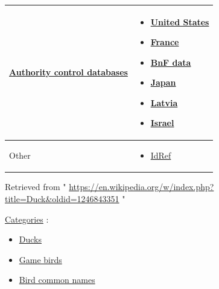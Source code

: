 \documentclass[11pt,a4paper]{article}
\begin{document}
\begin{table}[h]
\begin{tabular}{|l|l|}
\hline
\href{/wiki/Help:Authority\_control}{Authority control databases}  \begin{figure}[h] %
National & \begin{itemize} \item \href{https://id.loc.gov/authorities/sh85039879}{United States} \item \href{https://catalogue.bnf.fr/ark:/12148/cb119761481}{France} \item \href{https://data.bnf.fr/ark:/12148/cb119761481}{BnF data} \item \href{https://id.ndl.go.jp/auth/ndlna/00564819}{Japan} \item \href{https://kopkatalogs.lv/F?func=direct\&local\_base=lnc10\&doc\_number=000090751\&P\_CON\_LNG=ENG}{Latvia} \item \href{http://olduli.nli.org.il/F/?func=find-b\&local\_base=NLX10\&find\_code=UID\&request=987007565486205171}{Israel} \end{itemize} \\ \hline
Other & \begin{itemize} \item \href{https://www.idref.fr/027796124}{IdRef} \end{itemize} \\ \hline
\end{tabular}
\end{table}

Retrieved from " \href{https://en.wikipedia.org/w/index.php?title=Duck\&oldid=1246843351}{https://en.wikipedia.org/w/index.php?title=Duck\&oldid=1246843351} "

\href{/wiki/Help:Category}{Categories} :

\begin{itemize}
\item \href{/wiki/Category:Ducks}{Ducks}
\item \href{/wiki/Category:Game\_birds}{Game birds}
\item \href{/wiki/Category:Bird\_common\_names}{Bird common names}
\end{itemize}
\end{document}
